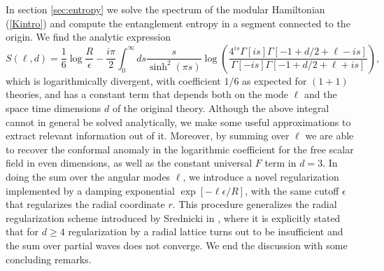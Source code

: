 \documentclass[12pt,a4paper]{article}
\begin{document}
In section \ref{sec:entropy} we solve the spectrum of the modular Hamiltonian (\ref{Kintro}) and compute the entanglement entropy in a segment connected to the origin. We find the analytic expression
\begin{equation}
S(\ell,d)=\frac{1}{6}\log{\frac{R}{\epsilon}}-\frac{i \pi}{2}\int_0^{\infty} ds \frac{s}{\sinh^2(\pi s)}\log{\left(\frac{4^{ i s}\Gamma\left[i s\right]\Gamma\left[-1+d/2+\ell-i s\right]}{\Gamma\left[-i s\right]\Gamma\left[-1+d/2+\ell+i s\right]}\right)},
\end{equation}
which is logarithmically divergent, with coefficient $1/6$ as expected for $(1+1)$ theories, and has a constant term that depends both on the mode $\ell$ and the space time dimensions $d$ of the original theory. Although the above integral cannot in general be solved analytically, we make some useful approximations to extract relevant information out of it. Moreover, by summing over $\ell$ we are able to recover the conformal anomaly in the logarithmic coefficient for the free scalar field in even dimensions, as well as the constant universal $F$ term in $d=3$. In doing the sum over the angular modes $\ell$, we introduce a novel regularization implemented by a damping exponential $\exp[-\ell\epsilon/R]$, with the same cutoff $\epsilon$ that regularizes the radial coordinate $r$. This procedure generalizes the radial regularization scheme introduced by Srednicki in \cite{Srednicki:1993im}, where it is explicitly stated that for $d \geqslant 4$  regularization by a radial lattice turns out to be insufficient and the sum over partial waves does not converge.
We end the discussion with some concluding remarks.
\end{document}
